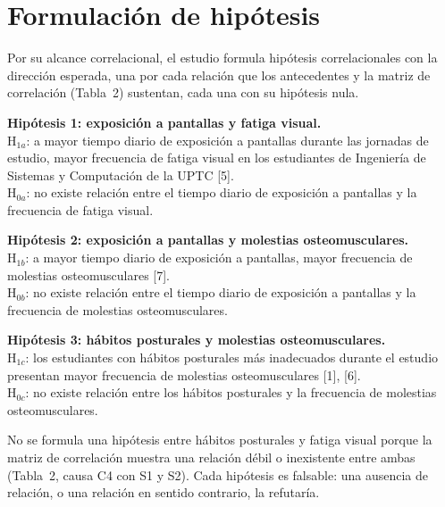 
\section{Formulación de hipótesis}

Por su alcance correlacional, el estudio formula hipótesis correlacionales con la
dirección esperada, una por cada relación que los antecedentes y la matriz de
correlación (Tabla~2) sustentan, cada una con su hipótesis nula.

\medskip
\noindent\textbf{Hipótesis 1: exposición a pantallas y fatiga visual.}\\
H$_{1a}$: a mayor tiempo diario de exposición a pantallas durante las jornadas de
estudio, mayor frecuencia de fatiga visual en los estudiantes de Ingeniería de Sistemas
y Computación de la UPTC [5].\\
H$_{0a}$: no existe relación entre el tiempo diario de exposición a pantallas y la
frecuencia de fatiga visual.

\medskip
\noindent\textbf{Hipótesis 2: exposición a pantallas y molestias osteomusculares.}\\
H$_{1b}$: a mayor tiempo diario de exposición a pantallas, mayor frecuencia de
molestias osteomusculares [7].\\
H$_{0b}$: no existe relación entre el tiempo diario de exposición a pantallas y la
frecuencia de molestias osteomusculares.

\medskip
\noindent\textbf{Hipótesis 3: hábitos posturales y molestias osteomusculares.}\\
H$_{1c}$: los estudiantes con hábitos posturales más inadecuados durante el estudio
presentan mayor frecuencia de molestias osteomusculares [1], [6].\\
H$_{0c}$: no existe relación entre los hábitos posturales y la frecuencia de molestias
osteomusculares.

\medskip
\noindent No se formula una hipótesis entre hábitos posturales y fatiga visual porque la
matriz de correlación muestra una relación débil o inexistente entre ambas (Tabla~2,
causa C4 con S1 y S2). Cada hipótesis es falsable: una ausencia de relación, o una
relación en sentido contrario, la refutaría.
